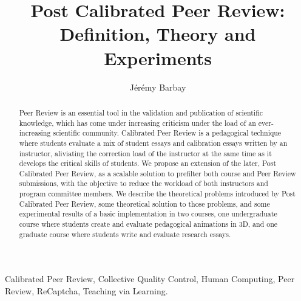 \documentclass[usletter]{llncs}
\begin{document}
\pagestyle{headings}  %

\mainmatter              %
\title{             Post Calibrated Peer Review: \\ Definition, Theory and Experiments            }
%
\author{J\'er\'emy Barbay}
%
%

\maketitle              %

\begin{abstract}
Peer Review is an essential tool in the validation and publication of scientific knowledge, which has come under increasing criticism under the load of an ever-increasing scientific community.  Calibrated Peer Review is a pedagogical technique where students evaluate a mix of student essays and calibration essays written by an instructor, aliviating the correction load of the instructor at the same time as it develops the critical skills of students. We propose an extension of the later, Post Calibrated Peer Review, as a scalable solution to prefilter both course and Peer Review submissions, with the objective to reduce the workload of both instructors and program committee members. We describe the theoretical problems introduced by Post Calibrated Peer Review, some theoretical solution to those problems, and some experimental results of a basic implementation in two courses, one undergraduate course where students create and evaluate pedagogical animations in 3D, and one graduate course where students write and evaluate research essays.
\end{abstract}

\begin{center}
  \begin{minipage}{.9\textwidth}
Calibrated Peer Review,
Collective Quality Control,
Human Computing,
Peer Review,
ReCaptcha,
Teaching via Learning.
  \end{minipage}
\end{center}
\end{document}
